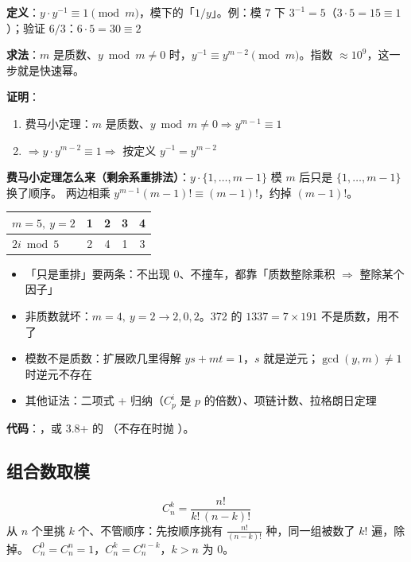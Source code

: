 \textbf{定义}：$y \cdot y^{-1} \equiv 1 \pmod m$，模下的「$1/y$」。例：模 7 下 $3^{-1} = 5$（$3 \cdot 5 = 15 \equiv 1$）；验证 $6/3$：$6 \cdot 5 = 30 \equiv 2$ \checkmark

\textbf{求法}：$m$ 是质数、$y \bmod m \ne 0$ 时，$y^{-1} \equiv y^{m-2} \pmod m$。指数 $\approx 10^9$，这一步就是快速幂。

\textbf{证明}：
\begin{enumerate}
\item 费马小定理：$m$ 是质数、$y \bmod m \ne 0 \Rightarrow y^{m-1} \equiv 1$
\item $\Rightarrow y \cdot y^{m-2} \equiv 1 \Rightarrow$ 按定义 $y^{-1} = y^{m-2}$
\end{enumerate}

\textbf{费马小定理怎么来（剩余系重排法）}：$y \cdot \{1, \dots, m-1\}$ 模 $m$ 后只是 $\{1, \dots, m-1\}$ 换了顺序。
两边相乘 $y^{m-1}(m-1)! \equiv (m-1)!$，约掉 $(m-1)!$。

\begin{center}\small
\begin{tabular}{@{}l cccc@{}}
\toprule
$m=5,\ y=2$ & 1 & 2 & 3 & 4\\
\midrule
$2i \bmod 5$ & 2 & 4 & 1 & 3\\
\bottomrule
\end{tabular}
\end{center}

\begin{itemize}
\item 「只是重排」要两条：不出现 0、不撞车，都靠「质数整除乘积 $\Rightarrow$ 整除某个因子」
\item 非质数就坏：$m=4,\ y=2 \to 2, 0, 2$。372 的 $1337 = 7 \times 191$ 不是质数，用不了
\item 模数不是质数：扩展欧几里得解 $y s + m t = 1$，$s$ 就是逆元；$\gcd(y, m) \ne 1$ 时逆元不存在
\item 其他证法：二项式 + 归纳（$C_p^i$ 是 $p$ 的倍数）、项链计数、拉格朗日定理
\end{itemize}

\textbf{代码}：，或 3.8+ 的 （不存在时抛 ）。

\subsection{组合数取模}

\[
C_n^k = \frac{n!}{k!\,(n-k)!}
\]
从 $n$ 个里挑 $k$ 个、不管顺序：先按顺序挑有 $\frac{n!}{(n-k)!}$ 种，同一组被数了 $k!$ 遍，除掉。
$C_n^0 = C_n^n = 1$，$C_n^k = C_n^{n-k}$，$k > n$ 为 0。

